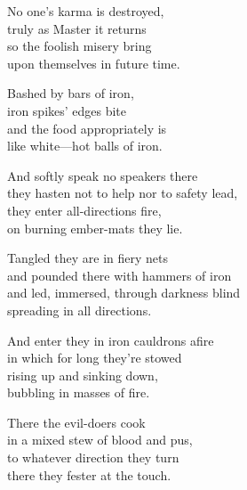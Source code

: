 \begin{MyDescription}{}
No one's karma is destroyed,\\
truly as Master it returns\\
so the foolish misery bring\\
upon themselves in future time.
\end{MyDescription} 

\begin{MyDescription}{}
Bashed by bars of iron,\\
iron spikes' edges bite\\
and the food appropriately is\\
like white—hot balls of iron.
\end{MyDescription} 

\begin{MyDescription}{}
And softly speak no speakers there\\
they hasten not to help nor to safety lead,\\
they enter all-directions fire,\\
on burning ember-mats they lie.
\end{MyDescription} 

\begin{MyDescription}{}
Tangled they are in fiery nets\\
and pounded there with hammers of iron\\
and led, immersed, through darkness blind\\
spreading in all directions.
\end{MyDescription} 

\begin{MyDescription}{}
And enter they in iron cauldrons afire\\
in which for long they're stowed\\
rising up and sinking down,\\
bubbling in masses of fire.
\end{MyDescription} 

\begin{MyDescription}{}
There the evil-doers cook\\
in a mixed stew of blood and pus,\\
to whatever direction they turn\\
there they fester at the touch.
\end{MyDescription} 

